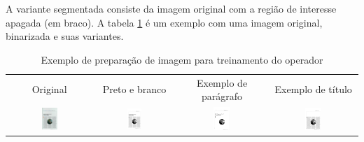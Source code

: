 \documentclass[a4paper,11pt]{article}
\begin{document}
      A variante segmentada consiste da imagem original com a região de interesse apagada (em braco). A tabela \ref{tab:imgset_example} é um exemplo com uma imagem original, binarizada e suas variantes.

      \begin{table}[hbt]
        \caption{Exemplo de preparação de imagem para treinamento do operador}
        \begin{center}
          \begin{tabular}{c c c c}
            Original & Preto e branco & Exemplo de parágrafo & Exemplo de título \\
            \includegraphics[width=0.2\textwidth]{assets/00000802.png}
            &
            \includegraphics[width=0.2\textwidth]{assets/original_images/cacm/802_black_and_white.png}
            &
            \includegraphics[width=0.2\textwidth]{assets/802_TextRegion_paragraph.png}
            &
            \includegraphics[width=0.2\textwidth]{assets/802_TextRegion_heading.png}
          \end{tabular}
        \end{center}
        \label{tab:imgset_example}
      \end{table}
\end{document}
